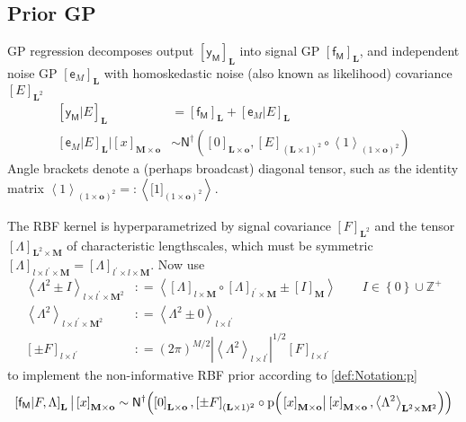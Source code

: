 \documentclass[preprint,12pt]{elsarticle}
\newcommand*{\M}[1]{\ensuremath{#1}\xspace}
\newcommand*{\x}{\times}
\newcommand*{\mi}[1]{\mathbf{#1}}
\newcommand*{\st}[1]{\mathbb{#1}}
\newcommand*{\rv}[1]{\mathsf{#1}}
\newcommand*{\te}[2][]{\left\lbrack{#2}\right\rbrack_{#1}}
\newcommand*{\tte}[2][]{\lbrack{#2}\rbrack_{#1}}
\newcommand*{\diag}[2][]{\left\langle{#2}\right\rangle_{#1}}
\newcommand*{\prob}[3]{\M{\mathrm{p}\!\left(\left.{#1}\right\vert{#2,#3}\right)}}
\newcommand*{\deq}{\M{\mathrel{\mathop:}=}}
\newcommand*{\deqr}{\M{=\mathrel{\mathop:}}}
\newcommand*{\gaussd}[2]{\mathsf{N}^{\dagger}\!\left({#1,#2}\right)}
\newcommand*{\modulus}[1]{\M{\left\lvert{#1}\right\rvert}}
\newcommand*{\set}[1]{\M{\left\lbrace{#1}\right\rbrace}}
\begin{document}
    \subsection{Prior GP} \label{sub:GPR:Prior}
        GP regression decomposes output $\te[\mi{L}]{\rv{y_M}}$ into signal GP $\te[\mi{L}]{\rv{f_M}}$, and independent noise GP $\te[\mi{L}]{\rv{e}_M}$ with homoskedastic noise (also known as likelihood) covariance $\te[\mi{L}^2]{E}$
        \begin{equation*}
            \begin{aligned}
                \te[\mi{L}]{\rv{y_M}\vert E} 
                &= \te[\mi{L}]{\rv{f_M}} + \te[\mi{L}]{\rv{e}_M\vert E} \\
                \te[\mi{L}]{\rv{e}_M\vert E} \big\vert \te[\mi{M}\x\mi{o}]{x}
                &\sim \gaussd{\te[\mi{L}\x\mi{o}]{0}}{\te[(\mi{L}\x 1)^2]{E} \circ \diag[(1\x\mi{o})^2]{1}}
            \end{aligned}
        \end{equation*}
        Angle brackets denote a (perhaps broadcast) diagonal tensor, such as the identity matrix $\diag[(1\x\mi{o})^2]{1} \deqr \diag[]{\tte[(1\x\mi{o})^2]{1}}$.

        The RBF kernel is hyperparametrized by signal covariance $\te[\mi{L}^2]{F}$ and the tensor $\te[\mi{L}^{2}\x\mi{M}]{\Lambda}$ of characteristic lengthscales, which must be symmetric $\te[l\x l^{\prime}\x\mi{M}]{\Lambda}=\te[l^{\prime}\x l\x\mi{M}]{\Lambda}$. Now use
        \begin{equation*}
            \begin{aligned}
                \diag[l\x l^{\prime}\x\mi{M}^{2}]{\Lambda^{2} \pm I} 
                &\deq \diag{\te[l\x\mi{M}]{\Lambda} \circ \te[l^{\prime}\x\mi{M}]{\Lambda} \pm \te[\mi{M}]{I}} 
                \qquad I \in \set{0}\cup\st{Z}^{+} \\
                \diag[l\x l^{\prime}\x\mi{M}^{2}]{\Lambda^{2}} &\deq 
                \diag[l\x l^{\prime}]{\Lambda^{2} \pm 0} \\
                    \te[l\x l^{\prime}]{\pm F} 
                &\deq (2 \pi)^{M/2} \modulus{\diag[l\x l^{\prime}]{\Lambda^{2}}}^{1/2} \te[l\x l^{\prime}]{F}
            \end{aligned}
        \end{equation*}
        to implement the non-informative RBF prior according to \cref{def:Notation:p}
        \begin{equation*}
            \te[\mi{L}]{\rv{f_M} \vert F,\Lambda}
            \big\vert \te[\mi{M}\x\mi{o}]{x} \sim \\
            \gaussd{\te[\mi{L}\x\mi{o}]{0}}{\te[(\mi{L}\x 1)^{2}]{\pm F} \circ 
            \prob{\te[\mi{M}\x\mi{o}]{x}}{\te[\mi{M}\x\mi{o}]{x}}
            {\diag[\mi{L}^{2}\x\mi{M}^{2}]{\Lambda^{2}}}} 
        \end{equation*}
        
\end{document}
